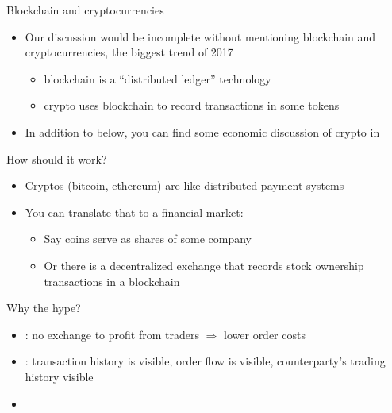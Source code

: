 \documentclass[english,10pt
,aspectratio=169
]{beamer}
\begin{document}
\begin{frame}{Blockchain and cryptocurrencies}
	\begin{itemize}
		\item Our discussion would be incomplete without mentioning \alert{blockchain} and \alert{cryptocurrencies}, the biggest trend of 2017
		\begin{itemize}
			\item blockchain is a ``distributed ledger'' technology
			\item crypto uses blockchain to record transactions in some tokens
		\end{itemize}
		\item In addition to below, you can find some economic discussion of crypto in \citet*{nica_cryptocurrencies_2017}
	\end{itemize}
\end{frame}


\begin{frame}{How should it work?}
	\begin{itemize}
		\item Cryptos (bitcoin, ethereum) are like distributed payment systems
		\item You can translate that to a financial market:
		\begin{itemize}
			\item Say coins serve as shares of some company
			\item Or there is a decentralized exchange that records stock ownership transactions in a blockchain
		\end{itemize}
	\end{itemize}
\end{frame}


\begin{frame}{Why the hype?}
	\begin{itemize}
		\item {}: no exchange to profit from traders $\Rightarrow$ lower order costs
		\item {}: transaction history is visible, order flow is visible, counterparty's trading history visible
		\item {}
	\end{itemize}
\end{frame}
\end{document}
